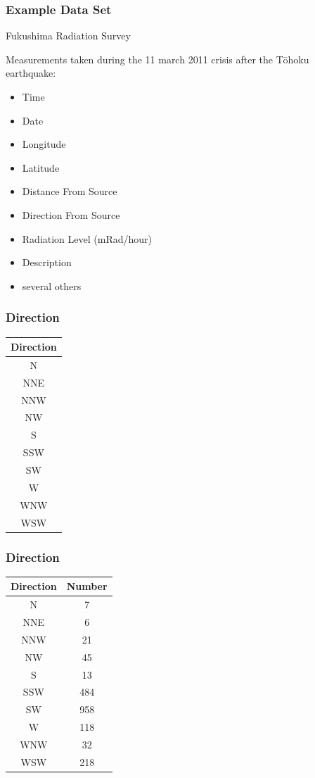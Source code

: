 \begin{frame}
  \frametitle{Example Data Set}

  Fukushima Radiation Survey

  Measurements taken during the 11 march 2011 crisis after the
  T\={o}hoku earthquake:
  \begin{itemize}
  \item Time
  \item Date
  \item Longitude
  \item Latitude
  \item Distance From Source
  \item Direction From Source
  \item Radiation Level (mRad/hour)
  \item Description
  \item several others
  \end{itemize}

\end{frame}



\begin{frame}
  \frametitle{Direction}

  \begin{tabular}{c}
    Direction \\ \hline 
    N   \\
    NNE  \\
    NNW  \\
    NW  \\
    S  \\
    SSW \\
    SW  \\
    W  \\
    WNW  \\
    WSW 
  \end{tabular}

\end{frame}

\begin{frame}
  \frametitle{Direction}

  \begin{tabular}{c|c}
    Direction & Number \\ \hline
    N  & 7 \\
    NNE & 6 \\
    NNW & 21 \\
    NW   & 45 \\
    S  & 13 \\
    SSW  & 484 \\
    SW   & 958 \\
    W & 118 \\
    WNW & 32 \\
    WSW & 218
  \end{tabular}

\end{frame}

